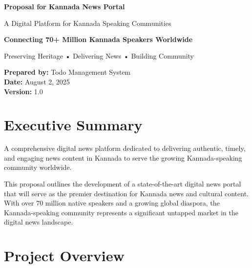 \documentclass[11pt,a4paper]{article}
\begin{document}
\begin{titlepage}
    \centering
    \vspace*{2cm}
    
    {\Huge\bfseries\color{primary} Proposal for Kannada News Portal}
    
    \vspace{1cm}
    {\Large\color{secondary} A Digital Platform for Kannada Speaking Communities}
    
    \vspace{2cm}
    
    \begin{tcolorbox}[colback=accent!10, colframe=accent, width=0.8\textwidth, arc=5mm]
        \centering
        \large\textbf{Connecting 70+ Million Kannada Speakers Worldwide}
        
        \vspace{0.5cm}
        Preserving Heritage • Delivering News • Building Community
    \end{tcolorbox}
    
    \vfill
    
    {\large
    \textbf{Prepared by:} Todo Management System\\
    \textbf{Date:} August 2, 2025\\
    \textbf{Version:} 1.0
    }
    
\end{titlepage}

\tableofcontents
\newpage

\section{Executive Summary}

\begin{highlight}
A comprehensive digital news platform dedicated to delivering authentic, timely, and engaging news content in Kannada to serve the growing Kannada-speaking community worldwide.
\end{highlight}

This proposal outlines the development of a state-of-the-art digital news portal that will serve as the premier destination for Kannada news and cultural content. With over 70 million native speakers and a growing global diaspora, the Kannada-speaking community represents a significant untapped market in the digital news landscape.

\section{Project Overview}
\end{document}
